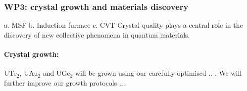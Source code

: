 \subsubsection*{WP3: crystal growth and materials discovery}
\noindent
a. MSF 
b. Induction furnace
c. CVT
Crystal quality plays a central role in the discovery of new collective phenomena in quantum materials. %


\paragraph{Crystal growth:} UTe$_2$, UAu$_2$ and UGe$_2$ will be grown using our carefully optimised .. .   We will further improve our growth protocols ... 

